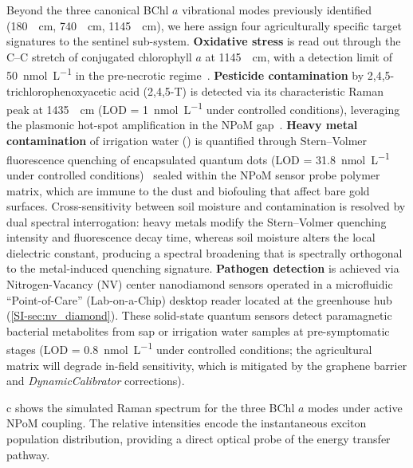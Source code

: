 \documentclass[preprint,12pt]{elsarticle}
\begin{document}
Beyond the three canonical BChl $a$ vibrational modes previously identified (\qty{180}{\per\cm}, \qty{740}{\per\cm}, \qty{1145}{\per\cm}), we here assign four agriculturally specific target signatures to the sentinel sub-system.
\textbf{Oxidative stress} is read out through the C--C stretch of conjugated chlorophyll $a$ at \qty{1145}{\per\cm}, with a detection limit of \qty{50}{\nano\mol\per\L} in the pre-necrotic regime~\cite{CiallaMay2024}.
\textbf{Pesticide contamination} by 2,4,5-trichlorophenoxyacetic acid (2,4,5-T) is detected via its characteristic Raman peak at \qty{1435}{\per\cm} (LOD = \qty{1}{\nano\mol\per\L} under controlled conditions), leveraging the plasmonic hot-spot amplification in the NPoM gap~\cite{CiallaMay2024}.
\textbf{Heavy metal contamination} of irrigation water () is quantified through Stern--Volmer fluorescence quenching of encapsulated  quantum dots (LOD = \qty{31.8}{\nano\mol\per\L} under controlled conditions)~\cite{Mohammed2023} sealed within the NPoM sensor probe polymer matrix, which are immune to the dust and biofouling that affect bare gold surfaces.
Cross-sensitivity between soil moisture and  contamination is resolved by dual spectral interrogation: heavy metals modify the Stern--Volmer quenching intensity and fluorescence decay time, whereas soil moisture alters the local dielectric constant, producing a spectral broadening that is spectrally orthogonal to the metal-induced quenching signature.
\textbf{Pathogen detection} is achieved via Nitrogen-Vacancy (NV) center nanodiamond sensors operated in a microfluidic ``Point-of-Care'' (Lab-on-a-Chip) desktop reader located at the greenhouse hub (\cref{SI-sec:nv_diamond}). These solid-state quantum sensors detect paramagnetic bacterial metabolites from sap or irrigation water samples at pre-symptomatic stages (LOD = \qty{0.8}{\nano\mol\per\L} under controlled conditions; the agricultural matrix will degrade in-field sensitivity, which is mitigated by the graphene barrier and \textit{DynamicCalibrator} corrections).

c shows the simulated Raman spectrum for the three BChl $a$ modes under active NPoM coupling.
The relative intensities encode the instantaneous exciton population distribution, providing a direct optical probe of the energy transfer pathway.
\end{document}
